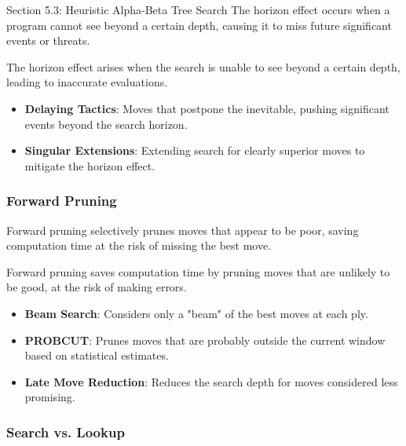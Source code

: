 \begin{notes}{Section 5.3: Heuristic Alpha-Beta Tree Search}
    The horizon effect occurs when a program cannot see beyond a certain depth, causing it to miss future significant events or threats.
    
    \begin{highlight}
        The horizon effect arises when the search is unable to see beyond a certain depth, leading to inaccurate evaluations.
        
        \begin{itemize}
            \item \textbf{Delaying Tactics}: Moves that postpone the inevitable, pushing significant events beyond the search horizon.
            \item \textbf{Singular Extensions}: Extending search for clearly superior moves to mitigate the horizon effect.
        \end{itemize}
    \end{highlight}
    
    \subsubsection*{Forward Pruning}
    
    Forward pruning selectively prunes moves that appear to be poor, saving computation time at the risk of missing the best move.
    
    \begin{highlight}
        Forward pruning saves computation time by pruning moves that are unlikely to be good, at the risk of making errors.
        
        \begin{itemize}
            \item \textbf{Beam Search}: Considers only a "beam" of the best moves at each ply.
            \item \textbf{PROBCUT}: Prunes moves that are probably outside the current window based on statistical estimates.
            \item \textbf{Late Move Reduction}: Reduces the search depth for moves considered less promising.
        \end{itemize}
    \end{highlight}
    
    \subsubsection*{Search vs. Lookup}
    

\end{notes}
